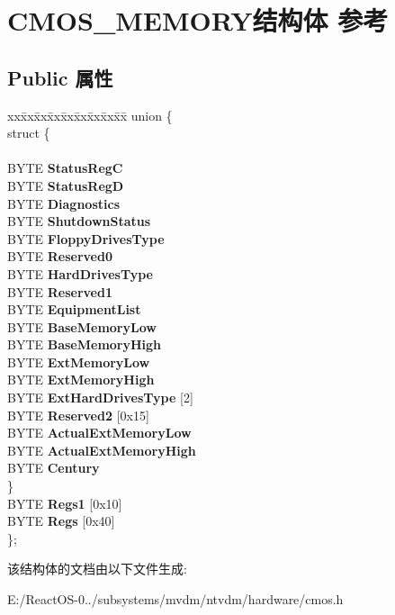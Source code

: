 \hypertarget{struct_c_m_o_s___m_e_m_o_r_y}{}\section{C\+M\+O\+S\+\_\+\+M\+E\+M\+O\+R\+Y结构体 参考}
\label{struct_c_m_o_s___m_e_m_o_r_y}
\subsection*{Public 属性}
\begin{DoxyCompactItemize}
\item 
\mbox{\label{struct_c_m_o_s___m_e_m_o_r_y_a6a90b02abfaf1a187b9296d59c0da127}} 
\begin{tabbing}
xx\=xx\=xx\=xx\=xx\=xx\=xx\=xx\=xx\=\kill
union \{\\
\mbox{\label{union_c_m_o_s___m_e_m_o_r_y_1_1_0D3719_a8995ec7a25154df7c12bb51f659a5a79}} 
\>struct \{\\
\>\\
\>\>BYTE {\bfseries StatusRegC}\\
\>\>BYTE {\bfseries StatusRegD}\\
\>\>BYTE {\bfseries Diagnostics}\\
\>\>BYTE {\bfseries ShutdownStatus}\\
\>\>BYTE {\bfseries FloppyDrivesType}\\
\>\>BYTE {\bfseries Reserved0}\\
\>\>BYTE {\bfseries HardDrivesType}\\
\>\>BYTE {\bfseries Reserved1}\\
\>\>BYTE {\bfseries EquipmentList}\\
\>\>BYTE {\bfseries BaseMemoryLow}\\
\>\>BYTE {\bfseries BaseMemoryHigh}\\
\>\>BYTE {\bfseries ExtMemoryLow}\\
\>\>BYTE {\bfseries ExtMemoryHigh}\\
\>\>BYTE {\bfseries ExtHardDrivesType} \mbox{[}2\mbox{]}\\
\>\>BYTE {\bfseries Reserved2} \mbox{[}0x15\mbox{]}\\
\>\>BYTE {\bfseries ActualExtMemoryLow}\\
\>\>BYTE {\bfseries ActualExtMemoryHigh}\\
\>\>BYTE {\bfseries Century}\\
\>\} \\
\>BYTE {\bfseries Regs1} \mbox{[}0x10\mbox{]}\\
\>BYTE {\bfseries Regs} \mbox{[}0x40\mbox{]}\\
\}; \\

\end{tabbing}\end{DoxyCompactItemize}


该结构体的文档由以下文件生成\+:\begin{DoxyCompactItemize}
\item 
E\+:/\+React\+O\+S-\/0../subsystems/mvdm/ntvdm/hardware/cmos.\+h\end{DoxyCompactItemize}
